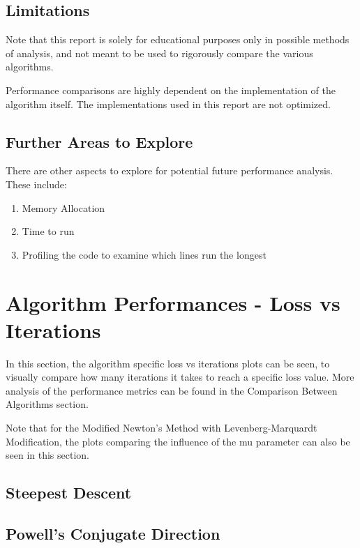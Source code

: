 \documentclass{article}
\begin{document}
    \subsection{Limitations}

    Note that this report is solely for educational purposes only in possible methods of analysis, 
    and not meant to be used to rigorously compare the various algorithms.

    Performance comparisons are highly dependent on the implementation of the algorithm itself.
    The implementations used in this report are not optimized.

    \subsection{Further Areas to Explore}

    There are other aspects to explore for potential future performance analysis.
    These include:

    \begin{enumerate}
        \item Memory Allocation
        \item Time to run
        \item Profiling the code to examine which lines run the longest
    \end{enumerate}

    \section{Algorithm Performances - Loss vs Iterations}

    In this section, the algorithm specific loss vs iterations plots can be seen, to visually compare how many iterations it takes to reach a specific loss value.
    More analysis of the performance metrics can be found in the Comparison Between Algorithms section.
    
    Note that for the Modified Newton's Method with Levenberg-Marquardt Modification, the plots comparing the influence of the mu parameter can also be seen in this section.

    \subsection{Steepest Descent}

    \subsection{Powell's Conjugate Direction}
\end{document}
